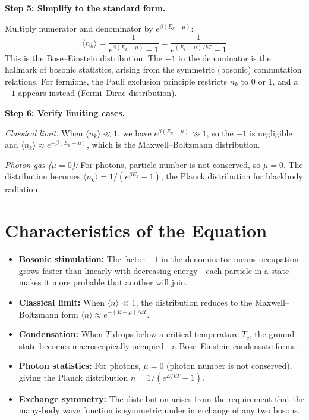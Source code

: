 \textbf{Step 5: Simplify to the standard form.}

Multiply numerator and denominator by $e^{\beta(E_k - \mu)}$:
\begin{equation}
\boxed{\langle n_k \rangle = \frac{1}{e^{\beta(E_k - \mu)} - 1} = \frac{1}{e^{(E_k - \mu)/kT} - 1}}
\end{equation}
This is the Bose--Einstein distribution. The $-1$ in the denominator is the hallmark of bosonic statistics, arising from the symmetric (bosonic) commutation relations. For fermions, the Pauli exclusion principle restricts $n_k$ to 0 or 1, and a $+1$ appears instead (Fermi--Dirac distribution).

\textbf{Step 6: Verify limiting cases.}

\emph{Classical limit:} When $\langle n_k \rangle \ll 1$, we have $e^{\beta(E_k - \mu)} \gg 1$, so the $-1$ is negligible and $\langle n_k \rangle \approx e^{-\beta(E_k - \mu)}$, which is the Maxwell--Boltzmann distribution.

\emph{Photon gas ($\mu = 0$):} For photons, particle number is not conserved, so $\mu = 0$. The distribution becomes $\langle n_k \rangle = 1/(e^{\beta E_k} - 1)$, the Planck distribution for blackbody radiation.

\section*{Characteristics of the Equation}

\begin{itemize}
\item \textbf{Bosonic stimulation:} The factor $-1$ in the denominator means occupation grows faster than linearly with decreasing energy---each particle in a state makes it more probable that another will join.
\item \textbf{Classical limit:} When $\langle n \rangle \ll 1$, the distribution reduces to the Maxwell--Boltzmann form $\langle n \rangle \approx e^{-(E-\mu)/kT}$.
\item \textbf{Condensation:} When $T$ drops below a critical temperature $T_c$, the ground state becomes macroscopically occupied---a Bose--Einstein condensate forms.
\item \textbf{Photon statistics:} For photons, $\mu = 0$ (photon number is not conserved), giving the Planck distribution $n = 1/(e^{E/kT} - 1)$.
\item \textbf{Exchange symmetry:} The distribution arises from the requirement that the many-body wave function is symmetric under interchange of any two bosons.
\end{itemize}
